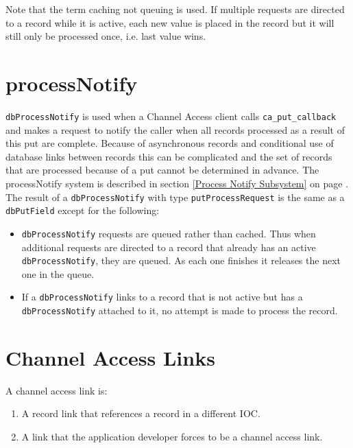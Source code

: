 Note that the term caching not queuing is used.
If multiple requests are directed to a record while it is active, each new value is placed in the record but it will still only be processed once, i.e. last value wins.

\section{processNotify}

\verb|dbProcessNotify| is used when a Channel Access client calls \verb|ca_put_callback| and makes a request to notify the caller when all 
records processed as a result of this put are complete.
Because of asynchronous records and conditional use of database links between records this can be complicated and the set of records that are processed because of a put cannot be determined in advance.
The processNotify system is described in section \ref{Process Notify Subsystem} on page \pageref{Process Notify Subsystem}.
The result of a \verb|dbProcessNotify| with type \verb|putProcessRequest| is the same as a \verb|dbPutField| except for the following:

\begin{itemize}
\item \verb|dbProcessNotify| requests are queued rather than cached.
Thus when additional requests are directed to a record that already has an active \verb|dbProcessNotify|, they are queued.
As each one finishes it releases the next one in the queue.

\item If a \verb|dbProcessNotify| links to a record that is not active but has a \verb|dbProcessNotify| attached to it, no attempt is made to process the record.

\end{itemize}

\section{Channel Access Links}

A channel access link is:

\begin{enumerate}
\item A record link that references a record in a different IOC.

\item A link that the application developer forces to be a channel access link.

\end{enumerate}

